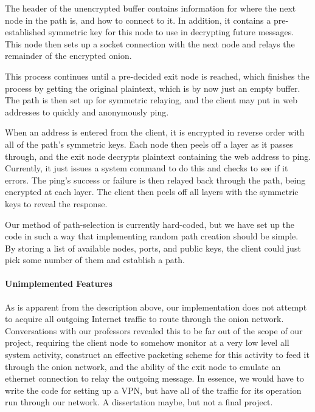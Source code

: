 \documentclass[12pt]{article}
\begin{document}
The header of the unencrypted buffer contains information for where the next node in the path is, and how to connect to it. In addition, it contains a pre-established symmetric key for this node to use in decrypting future messages. This node then sets up a socket connection with the next node and relays the remainder of the encrypted onion.

This process continues until a pre-decided exit node is reached, which finishes the process by getting the original plaintext, which is by now just an empty buffer. The path is then set up for symmetric relaying, and the client may put in web addresses to quickly and anonymously ping.

When an address is entered from the client, it is encrypted in reverse order with all of the path's symmetric keys. Each node then peels off a layer as it passes through, and the exit node decrypts plaintext containing the web address to ping. Currently, it just issues a system command to do this and checks to see if it errors. The ping's success or failure is then relayed back through the path, being encrypted at each layer. The client then peels off all layers with the symmetric keys to reveal the response.

Our method of path-selection is currently hard-coded, but we have set up the code in such a way that implementing random path creation should be simple. By storing a list of available nodes, ports, and public keys, the client could just pick some number of them and establish a path.

\paragraph{Unimplemented Features}
As is apparent from the description above, our implementation does not attempt to acquire all outgoing Internet traffic to route through the onion network. Conversations with our professors revealed this to be far out of the scope of our project, requiring the client node to somehow monitor at a very low level all system activity, construct an effective packeting scheme for this activity to feed it through the onion network, and the ability of the exit node to emulate an ethernet connection to relay the outgoing message. In essence, we would have to write the code for setting up a VPN, but have all of the traffic for its operation run through our network. A dissertation maybe, but not a final project.
\end{document}
